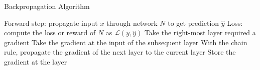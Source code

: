 \begin{algorithm}
    \caption{Backpropagation Algorithm}
    \begin{algorithmic}
        \State Forward step: propagate input $x$ through network $N$ to get prediction $\hat{y}$
        \State Loss: compute the loss or reward of $N$ as $\mathcal{L}(y, \hat{y})$
            \State Take the right-most layer required a gradient
            \State Take the gradient at the input of the subsequent layer
            \State With the chain rule, propagate the gradient of the next layer to the current layer
            \State Store the gradient at the layer
        \EndWhile
    \EndFunction
    \end{algorithmic}
    \label{ag:backpropagation}
\end{algorithm}

